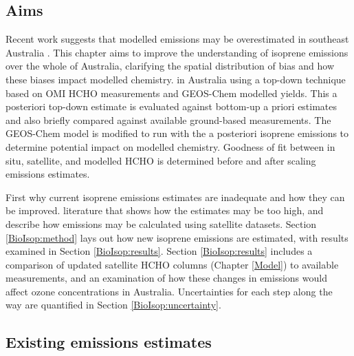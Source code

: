   \subsection{Aims}
    \label{BioIsop:intro:aims}
    
    Recent work suggests that modelled emissions may be overestimated in southeast Australia \parencite{Emmerson2016}.
    This chapter aims to improve the understanding of isoprene emissions over the whole of Australia, clarifying the spatial distribution of bias and how these biases impact modelled chemistry.
     in Australia using a top-down technique based on OMI HCHO measurements and GEOS-Chem modelled yields.
    This a posteriori top-down estimate is evaluated against bottom-up a priori estimates and also briefly compared against available ground-based measurements.
    The GEOS-Chem model is modified to run with the a posteriori isoprene emissions to determine potential impact on modelled chemistry.
    Goodness of fit between in situ, satellite, and modelled HCHO is determined before and after scaling emissions estimates.
    
    
    First  why current isoprene emissions estimates are inadequate and how they can be improved.
     literature that shows how the estimates may be too high, and describe how emissions may be calculated using satellite datasets.
    Section \ref{BioIsop:method} lays out how new isoprene emissions are estimated, with results examined in Section \ref{BioIsop:results}. 
    Section \ref{BioIsop:results} includes a comparison of updated satellite HCHO columns (Chapter \ref{Model}) to available measurements, and an examination of how these changes in emissions would affect ozone concentrations in Australia.
    Uncertainties for each step along the way are quantified in Section \ref{BioIsop:uncertainty}.
    
    
  \subsection{Existing emissions estimates}
    

